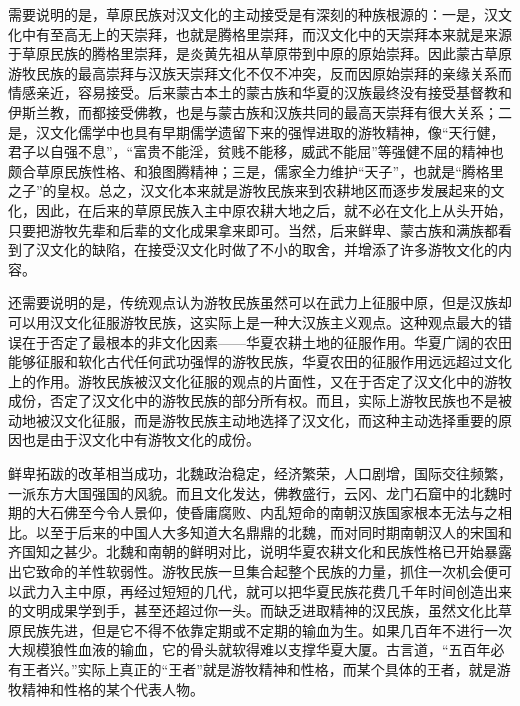 \par 需要说明的是，草原民族对汉文化的主动接受是有深刻的种族根源的：一是，汉文化中有至高无上的天崇拜，也就是腾格里崇拜，而汉文化中的天崇拜本来就是来源于草原民族的腾格里崇拜，是炎黄先祖从草原带到中原的原始崇拜。因此蒙古草原游牧民族的最高崇拜与汉族天崇拜文化不仅不冲突，反而因原始崇拜的亲缘关系而情感亲近，容易接受。后来蒙古本土的蒙古族和华夏的汉族最终没有接受基督教和伊斯兰教，而都接受佛教，也是与蒙古族和汉族共同的最高天崇拜有很大关系；二是，汉文化儒学中也具有早期儒学遗留下来的强悍进取的游牧精神，像“天行健，君子以自强不息”，“富贵不能淫，贫贱不能移，威武不能屈”等强健不屈的精神也颇合草原民族性格、和狼图腾精神；三是，儒家全力维护“天子”，也就是“腾格里之子”的皇权。总之，汉文化本来就是游牧民族来到农耕地区而逐步发展起来的文化，因此，在后来的草原民族入主中原农耕大地之后，就不必在文化上从头开始，只要把游牧先辈和后辈的文化成果拿来即可。当然，后来鲜卑、蒙古族和满族都看到了汉文化的缺陷，在接受汉文化时做了不小的取舍，并增添了许多游牧文化的内容。
\par 还需要说明的是，传统观点认为游牧民族虽然可以在武力上征服中原，但是汉族却可以用汉文化征服游牧民族，这实际上是一种大汉族主义观点。这种观点最大的错误在于否定了最根本的非文化因素——华夏农耕土地的征服作用。华夏广阔的农田能够征服和软化古代任何武功强悍的游牧民族，华夏农田的征服作用远远超过文化上的作用。游牧民族被汉文化征服的观点的片面性，又在于否定了汉文化中的游牧成份，否定了汉文化中的游牧民族的部分所有权。而且，实际上游牧民族也不是被动地被汉文化征服，而是游牧民族主动地选择了汉文化，而这种主动选择重要的原因也是由于汉文化中有游牧文化的成份。
\par 鲜卑拓跋的改革相当成功，北魏政治稳定，经济繁荣，人口剧增，国际交往频繁，一派东方大国强国的风貌。而且文化发达，佛教盛行，云冈、龙门石窟中的北魏时期的大石佛至今令人景仰，使昏庸腐败、内乱短命的南朝汉族国家根本无法与之相比。以至于后来的中国人大多知道大名鼎鼎的北魏，而对同时期南朝汉人的宋国和齐国知之甚少。北魏和南朝的鲜明对比，说明华夏农耕文化和民族性格已开始暴露出它致命的羊性软弱性。游牧民族一旦集合起整个民族的力量，抓住一次机会便可以武力入主中原，再经过短短的几代，就可以把华夏民族花费几千年时间创造出来的文明成果学到手，甚至还超过你一头。而缺乏进取精神的汉民族，虽然文化比草原民族先进，但是它不得不依靠定期或不定期的输血为生。如果几百年不进行一次大规模狼性血液的输血，它的骨头就软得难以支撑华夏大厦。古言道，“五百年必有王者兴。”实际上真正的“王者”就是游牧精神和性格，而某个具体的王者，就是游牧精神和性格的某个代表人物。
